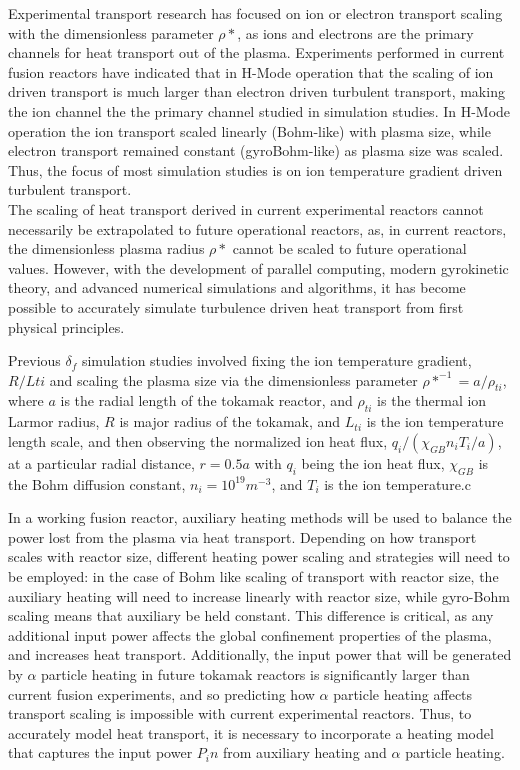 \documentclass{article}
\begin{document}
Experimental transport research has focused on ion or electron transport scaling with the dimensionless parameter $\rho*$, as ions and electrons are the primary channels for heat transport out of the plasma. Experiments performed in current fusion reactors have indicated that in H-Mode operation that the scaling of ion driven transport is much larger than electron driven turbulent transport, making the ion channel the the primary channel studied in simulation studies. In H-Mode operation the ion transport scaled linearly (Bohm-like) with plasma size, while electron transport remained constant (gyroBohm-like) as plasma size was scaled. Thus, the focus of most simulation studies is on ion temperature gradient driven turbulent transport. \\

The scaling of heat transport derived in current experimental reactors cannot necessarily be extrapolated to future operational reactors, as, in current reactors, the dimensionless plasma radius $\rho*$ cannot be scaled to future operational values. However, with the development of parallel computing, modern gyrokinetic theory, and advanced numerical simulations and algorithms, it has become possible to accurately simulate turbulence driven heat transport from first physical principles.

Previous $\delta_f$ simulation studies involved fixing the ion temperature gradient, $R/L{ti}$ and scaling the plasma size via the dimensionless parameter $\rho*^{-1} = a/\rho_{ti}$, where $a$ is the radial length of the tokamak reactor, and $\rho_{ti}$ is the thermal ion Larmor radius, $R$ is major radius of the tokamak, and $L_{ti}$ is the ion temperature length scale, and then observing the normalized ion heat flux, $q_i/(\chi_{GB}n_iT_i/a)$, at a particular radial distance, $r = 0.5a$ with $q_i $ being the ion heat flux, $\chi_{GB}$ is the Bohm diffusion constant, $n_i= 10^{19}m^{-3}$, and $T_i$ is the ion temperature.c


In a working fusion reactor, auxiliary heating methods will be used to balance the power lost from the plasma via heat transport. Depending on how transport scales with reactor size, different heating power scaling and strategies will need to be employed: in the case of Bohm like scaling of transport with reactor size, the auxiliary heating will need to increase linearly with reactor size, while gyro-Bohm scaling means that auxiliary be held constant. This difference is critical, as any additional input power affects the global confinement properties of the plasma, and increases heat transport. Additionally, the input power that will be generated by $\alpha$ particle heating in future tokamak reactors is significantly larger than current fusion experiments, and so predicting how $\alpha$ particle heating affects transport scaling is impossible with current experimental reactors.  Thus, to accurately model heat transport, it is necessary to incorporate a heating model that captures the input power $P_in$ from auxiliary heating and $\alpha$ particle heating.\\
\end{document}
